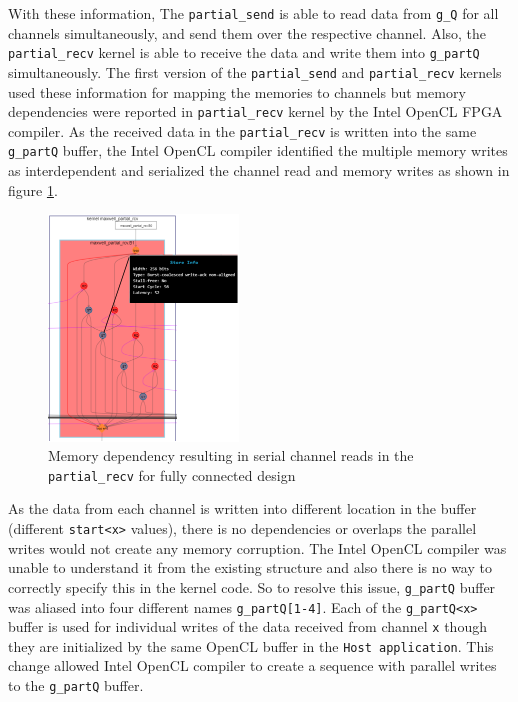 With these information, The \texttt{partial\_send} is able to read data from \texttt{g\_Q}
for all channels simultaneously, and send them over the respective channel. Also, the \texttt{partial\_recv}
kernel is able to receive the data and write them into \texttt{g\_partQ} simultaneously. The first
version of the \texttt{partial\_send} and \texttt{partial\_recv} kernels used these information for
mapping the memories to channels but memory dependencies were reported in \texttt{partial\_recv} kernel by the Intel OpenCL FPGA compiler.
As the received data in the \texttt{partial\_recv} is written into the same \texttt{g\_partQ} buffer,
the Intel OpenCL compiler identified the multiple memory writes as interdependent and serialized the channel
read and memory writes as shown in figure \ref{fig:serial_reads}.
\begin{figure}[ht]%
    \centering
    \includegraphics[width=0.45\textwidth]{images/serial_reads}
    \caption{Memory dependency resulting in serial channel reads in the \texttt{partial\_recv}
    for fully connected design}
    \label{fig:serial_reads}
\end{figure}
As the data from each channel is written
into different location in the buffer (different \texttt{start<x>} values), there is no
dependencies or overlaps the parallel writes would not create any memory corruption. The Intel OpenCL compiler
was unable to understand it from the existing structure and also there is no way to correctly specify this in the kernel code.
So to resolve this issue, \texttt{g\_partQ} buffer was aliased into four
different names \texttt{g\_partQ[1-4]}. Each of the \texttt{g\_partQ<x>} buffer is used
for individual writes of the data received from channel \texttt{x} though they are initialized by the same
OpenCL buffer in the \texttt{Host application}. This change allowed
Intel OpenCL compiler to create a sequence with parallel writes to the \texttt{g\_partQ} buffer.


